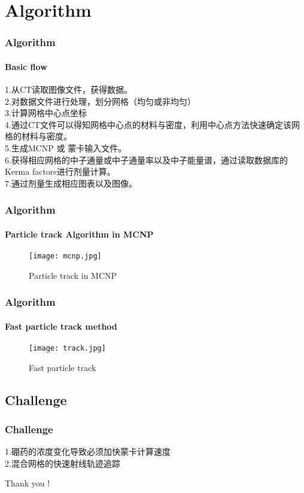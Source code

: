 \documentclass{beamer}
\begin{document}
\section{Algorithm}
\begin{frame}
\frametitle{Algorithm}
\framesubtitle{Basic flow}
\begin{spacing}{1.5}
 1.从CT读取图像文件，获得数据。\\
 2.对数据文件进行处理，划分网格（均匀或非均匀）\\
 3.计算网格中心点坐标\\
 4.通过CT文件可以得知网格中心点的材料与密度，利用中心点方法快速确定该网格的材料与密度。\\
 5.生成MCNP 或 蒙卡输入文件。\\
 6.获得相应网格的中子通量或中子通量率以及中子能量谱，通过读取数据库的Kerma factors进行剂量计算。\\
 7.通过剂量生成相应图表以及图像。
\end{spacing}
\end{frame}

\begin{frame}
\frametitle{Algorithm}
\framesubtitle{Particle track Algorithm in MCNP}
\begin{figure}[H]%
	\centering  %
	\texttt{[image: mcnp.jpg]}  %
	\caption{Particle track in MCNP}  %
\end{figure}
\end{frame}


\begin{frame}
\frametitle{Algorithm}
\framesubtitle{Fast particle track method}
\begin{figure}[H]%
	\centering  %
	\texttt{[image: track.jpg]}  %
	\caption{Fast particle track}  %
\end{figure}
\end{frame}
  

\begin{frame}
\section{Challenge}
\frametitle{Challenge}
\setlength{\parindent}{4em}
\begin{spacing}{1.5}
  1.硼药的浓度变化导致必须加快蒙卡计算速度\\
  2.混合网格的快速射线轨迹追踪\\
\end{spacing}
\end{frame}


\begin{frame}
\begin{center}
\Huge Thank you !
\end{center}
\end{frame}
 
\end{document}
